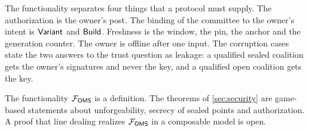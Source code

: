 The functionality separates four things that a protocol must supply. The authorization is the owner's \textsf{post}. The binding of the committee to the owner's intent is $\mathsf{Variant}$ and $\mathsf{Build}$. Freshness is the window, the pin, the anchor and the generation counter. The owner is offline after one input. The corruption cases state the two answers to the trust question as leakage: a qualified sealed coalition gets the owner's signatures and never the key, and a qualified open coalition gets the key.

\begin{remark}\label{rem:foms}
The functionality $\mathcal{F}_{\mathsf{OMS}}$ is a definition. The theorems of \cref{sec:security} are game-based statements about unforgeability, secrecy of sealed points and authorization. A proof that line dealing realizes $\mathcal{F}_{\mathsf{OMS}}$ in a composable model is open.
\end{remark}
